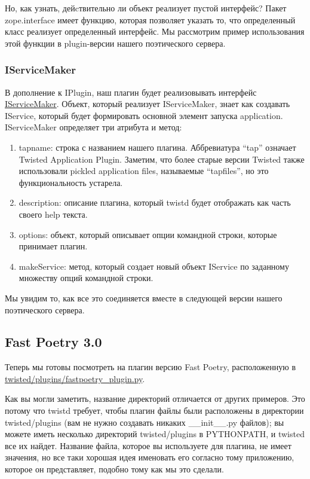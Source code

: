Но, как узнать, дейcтвительно ли объект реализует пустой интерфейс? 
Пакет zope.interface имеет функцию, которая позволяет указать то, что 
определенный класс реализует определенный интерфейс. Мы рассмотрим пример 
использования этой функции в plugin-версии нашего поэтического сервера. 


\subsubsection{IServiceMaker}

В дополнение к IPlugin, наш плагин будет реализовывать 
интерфейс \href{http://twistedmatrix.com/trac/browser/tags/releases/twisted-10.0.0/twisted/application/service.py#L25}{IServiceMaker}. Объект, который реализует IServiceMaker, знает 
как создавать IService, который будет формировать основной элемент 
запуска application. IServiceMaker определяет три атрибута и метод:

\begin{enumerate}
\item tapname: строка с названием нашего плагина. Аббревиатура ``tap'' 
означает Twisted Application Plugin. Заметим, что более старые версии Twisted 
также использовали pickled application files, называемые ``tapfiles'', но это функциональность 
устарела.
\item description: описание плагина, который twistd будет отображать как часть своего help текста.
\item options: объект, который описывает опции командной строки, которые принимает плагин.
\item makeService: метод, который создает новый объект IService 
по заданному множеству опций командной строки.

\end{enumerate}

Мы увидим то, как все это соединяется вместе в следующей версии нашего 
поэтического сервера.


\subsection{Fast Poetry 3.0}

Теперь мы готовы посмотреть на плагин версию Fast Poetry, 
расположенную в  
\href{http://github.com/jdavisp3/twisted-intro/blob/master/twisted/plugins/fastpoetry\_plugin.py#L1}{twisted/plugins/fastpoetry\_plugin.py}.


Как вы могли заметить, название директорий отличается от других 
примеров. Это потому что twistd требует, чтобы плагин файлы 
были расположены в директории twisted/plugins (вам не нужно 
создавать никаких \_\_init\_\_.py файлов); вы можете иметь 
несколько директорий twisted/plugins в PYTHONPATH, 
и twisted все их найдет. Название файла, которое вы используете 
для плагина, не имеет значения, но все таки хорошая идея 
именовать его согласно тому приложению, которое он представляет, 
подобно тому как мы это сделали.


